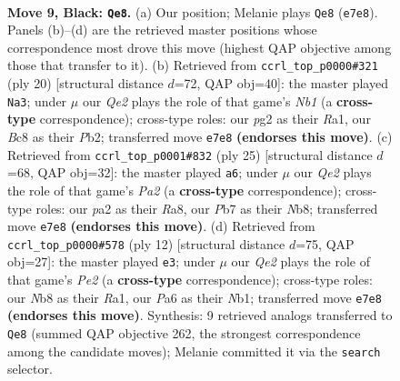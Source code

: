\documentclass[11pt]{article}
\begin{document}
\clearpage

\begin{figure}[p]\centering
\begin{subfigure}{0.46\textwidth}\centering
\resizebox{\linewidth}{!}{%
\newchessgame
\chessboard[
  setfen={rnb2rk1/1ppnqppp/p3p3/3pP3/3P1P2/2N4N/PPP2KPP/R2Q1B1R b - - 3 9},
  showmover=false,
  pgfstyle=straightmove, color=movearrow, markmove={e7-e8}
]}
\caption{}
\end{subfigure}\hfill
\begin{subfigure}{0.46\textwidth}\centering
\resizebox{\linewidth}{!}{%
\newchessgame
\chessboard[
  setfen={r1bqr1k1/1pp2ppp/2n2n2/2p1p3/p3P3/2PP1NP1/PP2QPBP/RN3RK1 w - - 0 11},
  showmover=false,
  pgfstyle=straightmove, color=movearrow, markmove={b1-a3}
]}
\caption{}
\end{subfigure}
\\[4pt]
\begin{subfigure}{0.46\textwidth}\centering
\resizebox{\linewidth}{!}{%
\newchessgame
\chessboard[
  setfen={rn3rk1/pbpnq1pp/1p1pp3/5pP1/2PP4/P1NBPN2/1P3P1P/R2QK1R1 b Q - 0 13},
  showmover=false,
  pgfstyle=straightmove, color=movearrow, markmove={a7-a6}
]}
\caption{}
\end{subfigure}\hfill
\begin{subfigure}{0.46\textwidth}\centering
\resizebox{\linewidth}{!}{%
\newchessgame
\chessboard[
  setfen={r1bqkb1r/1pp2ppp/p1n1pn2/8/2pP4/5NP1/PP2PPBP/RNBQ1RK1 w kq - 2 7},
  showmover=false,
  pgfstyle=straightmove, color=movearrow, markmove={e2-e3}
]}
\caption{}
\end{subfigure}
\caption{\textbf{Move 9, Black: \texttt{Qe8}.} (a) Our position; Melanie plays \texttt{Qe8} (\texttt{e7e8}). Panels (b)--(d) are the retrieved master positions whose correspondence most drove this move (highest QAP objective among those that transfer to it). (b) Retrieved from \texttt{ccrl\_top\_p0000\#321} (ply 20) [structural distance $d$=72, QAP obj=40]: the master played \texttt{Na3}; under $\mu$ our \emph{Qe2} plays the role of that game's \emph{Nb1} (a \textbf{cross-type} correspondence); cross-type roles: our \emph{p}g2 as their \emph{R}a1, our \emph{B}c8 as their \emph{P}b2; transferred move \texttt{e7e8} \textbf{(endorses this move)}. (c) Retrieved from \texttt{ccrl\_top\_p0001\#832} (ply 25) [structural distance $d$=68, QAP obj=32]: the master played \texttt{a6}; under $\mu$ our \emph{Qe2} plays the role of that game's \emph{Pa2} (a \textbf{cross-type} correspondence); cross-type roles: our \emph{p}a2 as their \emph{R}a8, our \emph{P}b7 as their \emph{N}b8; transferred move \texttt{e7e8} \textbf{(endorses this move)}. (d) Retrieved from \texttt{ccrl\_top\_p0000\#578} (ply 12) [structural distance $d$=75, QAP obj=27]: the master played \texttt{e3}; under $\mu$ our \emph{Qe2} plays the role of that game's \emph{Pe2} (a \textbf{cross-type} correspondence); cross-type roles: our \emph{N}b8 as their \emph{R}a1, our \emph{P}a6 as their \emph{N}b1; transferred move \texttt{e7e8} \textbf{(endorses this move)}. Synthesis: 9 retrieved analogs transferred to \texttt{Qe8} (summed QAP objective 262, the strongest correspondence among the candidate moves); Melanie committed it via the \texttt{search} selector.}
\label{fig:thought-m17}
\end{figure}
\end{document}

